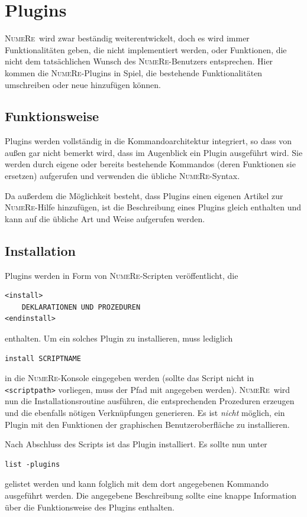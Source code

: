 \documentclass[DIV=14,headsepline,footsepline]{scrbook}
\newcommand{\NR}{\textsc{Nu\-me\-Re}}
\begin{document}
		\chapter{Plugins}
			\NR\ wird zwar beständig weiterentwickelt, doch es wird immer Funktionalitäten geben, die nicht implementiert werden, oder Funktionen, die nicht dem tatsächlichen Wunsch des \NR-Benutzers entsprechen. Hier kommen die \NR-Plugins in Spiel, die bestehende Funktionalitäten umschreiben oder neue hinzufügen können.
			\section{Funktionsweise}
				Plugins werden vollständig in die Kommandoarchitektur integriert, so dass von außen gar nicht bemerkt wird, dass im Augenblick ein Plugin ausgeführt wird. Sie werden durch eigene oder bereits bestehende Kommandos (deren Funktionen sie ersetzen) aufgerufen und verwenden die übliche \NR-Syntax.
				
				Da außerdem die Möglichkeit besteht, dass Plugins einen eigenen Artikel zur \NR-Hilfe hinzufügen, ist die Beschreibung eines Plugins gleich enthalten und kann auf die übliche Art und Weise aufgerufen werden.
			\section{Installation}
				Plugins werden in Form von \NR-Scripten veröffentlicht, die
				\begin{lstlisting}
<install>
	DEKLARATIONEN UND PROZEDUREN
<endinstall>
				\end{lstlisting}
				enthalten. Um ein solches Plugin zu installieren, muss lediglich
				\begin{lstlisting}
install SCRIPTNAME
				\end{lstlisting}
				in die \NR-Konsole eingegeben werden (sollte das Script nicht in \verb+<scriptpath>+ vorliegen, muss der Pfad mit angegeben werden). \NR\ wird nun die Installationsroutine ausführen, die entsprechenden Prozeduren erzeugen und die ebenfalls nötigen Verknüpfungen generieren. Es ist \emph{nicht} möglich, ein Plugin mit den Funktionen der graphischen Benutzeroberfläche zu installieren.
				
				Nach Abschluss des Scripts ist das Plugin installiert. Es sollte nun unter
				\begin{lstlisting}
list -plugins
				\end{lstlisting}
				gelistet werden und kann folglich mit dem dort angegebenen Kommando ausgeführt werden. Die angegebene Beschreibung sollte eine knappe Information über die Funktionsweise des Plugins enthalten.
				
\end{document}

